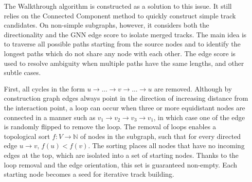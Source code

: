 The Walkthrough algorithm is constructed as a solution to this issue.
It still relies on the Connected Component method to quickly construct simple track candidates.
On non-simple subgraphs, however, it considers both the directionality and the GNN edge score to isolate merged tracks. 
The main idea is to traverse all possible paths starting from the source nodes and to identify the longest paths which do not share any node with each other. 
The edge score is used to resolve ambiguity when multiple paths have the same lengths, and other subtle cases.

First, all cycles in the form $u\rightarrow\dotsc \rightarrow v \rightarrow \dotsc \rightarrow u $ are removed.
Although by construction graph edges always point in the direction of increasing distance from the interaction point, a loop can occur when three or more equidistant nodes are connected in a manner such as $v_1\rightarrow v_2\rightarrow v_3 \rightarrow v_1$, in which case one of the edge is randomly flipped to remove the loop. 
The removal of loops enables a topological sort $f: V\rightarrow \mathbb{N}$ of nodes in the subgraph, such that for every directed edge $u\rightarrow v$, $f(u)<f(v)$. 
The sorting places all nodes that have no incoming edges at the top, which are isolated into a set of starting nodes. 
Thanks to the loop removal and the edge orientation, this set is guaranteed non-empty.
Each starting node becomes a seed for iterative track building.

